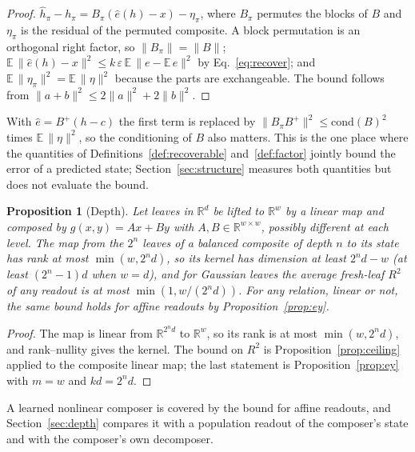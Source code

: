 \documentclass[10pt]{article}
\theoremstyle{plain}
\newtheorem{proposition}{Proposition}
\theoremstyle{remark}
\newcommand{\R}{\mathbb{R}}
\begin{document}
\begin{proof}
$\hat{h}_\pi - h_\pi = B_\pi(\hat{e}(h) - x) - \eta_\pi$, where $B_\pi$ permutes the blocks of $B$ and $\eta_\pi$ is the residual of the permuted composite. A block permutation is an orthogonal right factor, so $\lVert B_\pi \rVert = \lVert B \rVert$; $\mathbb{E}\,\lVert \hat{e}(h) - x \rVert^2 \le k\,\varepsilon\,\mathbb{E}\,\lVert e - \mathbb{E}\,e\rVert^2$ by Eq.~\eqref{eq:recover}; and $\mathbb{E}\,\lVert \eta_\pi \rVert^2 = \mathbb{E}\,\lVert \eta \rVert^2$ because the parts are exchangeable. The bound follows from $\lVert a + b \rVert^2 \le 2\lVert a \rVert^2 + 2\lVert b \rVert^2$.
\end{proof}

\noindent
With $\hat{e} = B^{+}(h - c)$ the first term is replaced by $\lVert B_\pi B^{+} \rVert^2 \le \mathrm{cond}(B)^2$ times $\mathbb{E}\,\lVert \eta \rVert^2$, so the conditioning of $B$ also matters. This is the one place where the quantities of Definitions~\ref{def:recoverable} and~\ref{def:factor} jointly bound the error of a predicted state; Section~\ref{sec:structure} measures both quantities but does not evaluate the bound.

\begin{proposition}[Depth]
\label{prop:depth}
Let leaves in $\R^d$ be lifted to $\R^w$ by a linear map and composed by $g(x, y) = Ax + By$ with $A, B \in \R^{w \times w}$, possibly different at each level. The map from the $2^n$ leaves of a balanced composite of depth $n$ to its state has rank at most $\min(w, 2^n d)$, so its kernel has dimension at least $2^n d - w$ (at least $(2^n - 1)d$ when $w = d$), and for Gaussian leaves the average fresh-leaf $R^2$ of any readout is at most $\min(1, w/(2^n d))$. For any relation, linear or not, the same bound holds for affine readouts by Proposition~\ref{prop:ey}.
\end{proposition}

\begin{proof}
The map is linear from $\R^{2^n d}$ to $\R^w$, so its rank is at most $\min(w, 2^n d)$, and rank--nullity gives the kernel. The bound on $R^2$ is Proposition~\ref{prop:ceiling} applied to the composite linear map; the last statement is Proposition~\ref{prop:ey} with $m = w$ and $kd = 2^n d$.
\end{proof}

\noindent
A learned nonlinear composer is covered by the bound for affine readouts, and Section~\ref{sec:depth} compares it with a population readout of the composer's state and with the composer's own decomposer.
\end{document}
